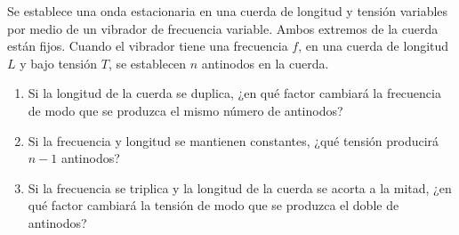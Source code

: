 \item Se establece una onda estacionaria en una cuerda de longitud y tensión variables por medio de un vibrador de frecuencia variable. Ambos extremos de la cuerda están fijos. Cuando el vibrador tiene una frecuencia $f$, en una cuerda de longitud $L$ y bajo tensión $T$, se establecen $n$ antinodos en la cuerda.
\begin{enumerate}
    \item Si la longitud de la cuerda se duplica, ¿en qué factor cambiará la frecuencia de modo que se produzca el mismo número de antinodos?
    \item Si la frecuencia y longitud se mantienen constantes, ¿qué tensión producirá $n - 1$ antinodos?
    \item Si la frecuencia se triplica y la longitud de la cuerda se acorta a la mitad, ¿en qué factor cambiará la tensión de modo que se produzca el doble de antinodos?
\end{enumerate}